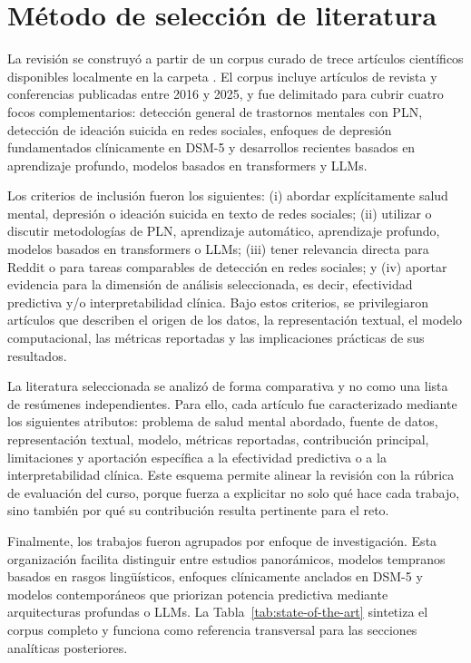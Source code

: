 \section{Método de selección de literatura}

La revisión se construyó a partir de un corpus curado de trece artículos científicos disponibles localmente en la carpeta . El corpus incluye artículos de revista y conferencias publicadas entre 2016 y 2025, y fue delimitado para cubrir cuatro focos complementarios: detección general de trastornos mentales con PLN, detección de ideación suicida en redes sociales, enfoques de depresión fundamentados clínicamente en DSM-5 y desarrollos recientes basados en aprendizaje profundo, modelos basados en transformers y LLMs.

Los criterios de inclusión fueron los siguientes: (i) abordar explícitamente salud mental, depresión o ideación suicida en texto de redes sociales; (ii) utilizar o discutir metodologías de PLN, aprendizaje automático, aprendizaje profundo, modelos basados en transformers o LLMs; (iii) tener relevancia directa para Reddit o para tareas comparables de detección en redes sociales; y (iv) aportar evidencia para la dimensión de análisis seleccionada, es decir, efectividad predictiva y/o interpretabilidad clínica. Bajo estos criterios, se privilegiaron artículos que describen el origen de los datos, la representación textual, el modelo computacional, las métricas reportadas y las implicaciones prácticas de sus resultados.

La literatura seleccionada se analizó de forma comparativa y no como una lista de resúmenes independientes. Para ello, cada artículo fue caracterizado mediante los siguientes atributos: problema de salud mental abordado, fuente de datos, representación textual, modelo, métricas reportadas, contribución principal, limitaciones y aportación específica a la efectividad predictiva o a la interpretabilidad clínica. Este esquema permite alinear la revisión con la rúbrica de evaluación del curso, porque fuerza a explicitar no solo qué hace cada trabajo, sino también por qué su contribución resulta pertinente para el reto.

Finalmente, los trabajos fueron agrupados por enfoque de investigación. Esta organización facilita distinguir entre estudios panorámicos, modelos tempranos basados en rasgos lingüísticos, enfoques clínicamente anclados en DSM-5 y modelos contemporáneos que priorizan potencia predictiva mediante arquitecturas profundas o LLMs. La Tabla~\ref{tab:state-of-the-art} sintetiza el corpus completo y funciona como referencia transversal para las secciones analíticas posteriores.
